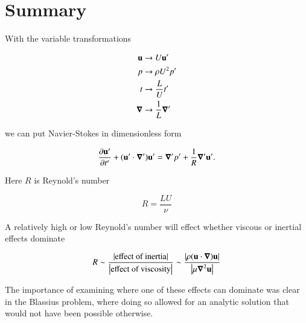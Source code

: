 \section{Summary}

With the variable transformations

\begin{align}\label{eqn:continuumFluidsReview:2150}
\Bu &\rightarrow U \Bu' \\
p &\rightarrow \rho U^2 p' \\
t &\rightarrow \frac{L}{U} t' \\
\spacegrad &\rightarrow \inv{L} \spacegrad'
\end{align}

we can put Navier-Stokes in dimensionless form

\begin{equation}\label{eqn:continuumFluidsReview:2170}
\PD{t'}{\Bu'} + (\Bu' \cdot \spacegrad') \Bu' = \spacegrad' p' + \inv{R} \spacegrad' \Bu'.
\end{equation}

Here $R$ is Reynold's number

\begin{equation}\label{eqn:continuumFluidsReview:2190}
R = \frac{L U}{\nu}
\end{equation}

A relatively high or low Reynold's number will effect whether viscous or inertial effects dominate

\begin{equation}\label{eqn:continuumFluidsReview:2210}
R 
\sim \frac{\Abs{\text{effect of inertia}}}{\Abs{\text{effect of viscosity}}} 
\sim 
\frac{ \Abs{\rho ( \Bu \cdot \spacegrad ) \Bu } }{\Abs{ \mu \spacegrad^2 \Bu}}
\end{equation}

The importance of examining where one of these effects can dominate was clear in the Blassius problem, where doing so allowed for an analytic solution that would not have been possible otherwise.

